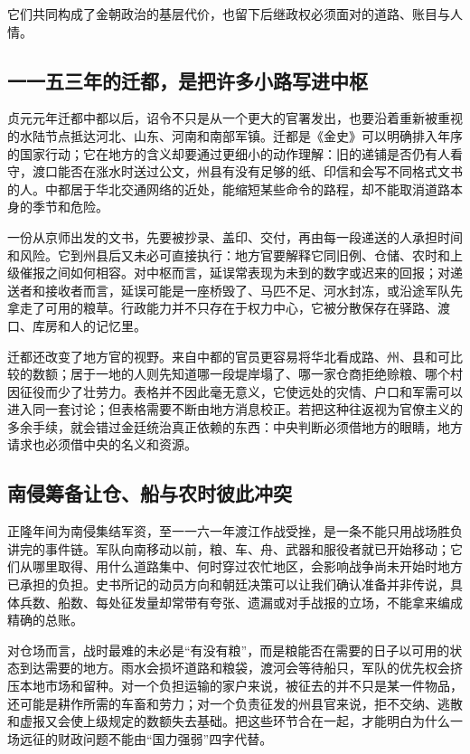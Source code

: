 它们共同构成了金朝政治的基层代价，也留下后继政权必须面对的道路、账目与人情。

\subsection{一一五三年的迁都，是把许多小路写进中枢}

贞元元年迁都中都以后，诏令不只是从一个更大的官署发出，也要沿着重新被重视的水陆节点抵达河北、山东、河南和南部军镇。迁都是《金史》可以明确排入年序的国家行动；它在地方的含义却要通过更细小的动作理解：旧的递铺是否仍有人看守，渡口能否在涨水时送过公文，州县有没有足够的纸、印信和会写不同格式文书的人。中都居于华北交通网络的近处，能缩短某些命令的路程，却不能取消道路本身的季节和危险。

一份从京师出发的文书，先要被抄录、盖印、交付，再由每一段递送的人承担时间和风险。它到州县后又未必可直接执行：地方官要解释它同旧例、仓储、农时和上级催报之间如何相容。对中枢而言，延误常表现为未到的数字或迟来的回报；对递送者和接收者而言，延误可能是一座桥毁了、马匹不足、河水封冻，或沿途军队先拿走了可用的粮草。行政能力并不只存在于权力中心，它被分散保存在驿路、渡口、库房和人的记忆里。

迁都还改变了地方官的视野。来自中都的官员更容易将华北看成路、州、县和可比较的数额；居于一地的人则先知道哪一段堤岸塌了、哪一家仓商拒绝赊粮、哪个村因征役而少了壮劳力。表格并不因此毫无意义，它使远处的灾情、户口和军需可以进入同一套讨论；但表格需要不断由地方消息校正。若把这种往返视为官僚主义的多余手续，就会错过金廷统治真正依赖的东西：中央判断必须借地方的眼睛，地方请求也必须借中央的名义和资源。

\subsection{南侵筹备让仓、船与农时彼此冲突}

正隆年间为南侵集结军资，至一一六一年渡江作战受挫，是一条不能只用战场胜负讲完的事件链。军队向南移动以前，粮、车、舟、武器和服役者就已开始移动；它们从哪里取得、用什么道路集中、何时穿过农忙地区，会影响战争尚未开始时地方已承担的负担。史书所记的动员方向和朝廷决策可以让我们确认准备并非传说，具体兵数、船数、每处征发量却常带有夸张、遗漏或对手战报的立场，不能拿来编成精确的总账。

对仓场而言，战时最难的未必是“有没有粮”，而是粮能否在需要的日子以可用的状态到达需要的地方。雨水会损坏道路和粮袋，渡河会等待船只，军队的优先权会挤压本地市场和留种。对一个负担运输的家户来说，被征去的并不只是某一件物品，还可能是耕作所需的车畜和劳力；对一个负责征发的州县官来说，拒不交纳、逃散和虚报又会使上级规定的数额失去基础。把这些环节合在一起，才能明白为什么一场远征的财政问题不能由“国力强弱”四字代替。

